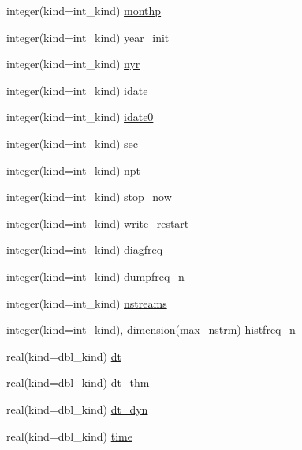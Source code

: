 \begin{DoxyCompactItemize}
\item 
integer(kind=int\_\-kind) \hyperlink{namespaceice__calendar_a2e88fbbaa94dea7baf4d46c950c5be7a}{monthp}
\item 
integer(kind=int\_\-kind) \hyperlink{namespaceice__calendar_afc3c91ad4e19b987b1e28293ec6ec2b7}{year\_\-init}
\item 
integer(kind=int\_\-kind) \hyperlink{namespaceice__calendar_ab1bfcde8457aafd600e9ff69b7ec6a3f}{nyr}
\item 
integer(kind=int\_\-kind) \hyperlink{namespaceice__calendar_aefc3f061e0c4d064b85e0fa84f0c92af}{idate}
\item 
integer(kind=int\_\-kind) \hyperlink{namespaceice__calendar_a60baa4e8bed2d175eaf6170ab792aa03}{idate0}
\item 
integer(kind=int\_\-kind) \hyperlink{namespaceice__calendar_a80ddbc12ee9fd336c3148dd0e31f420c}{sec}
\item 
integer(kind=int\_\-kind) \hyperlink{namespaceice__calendar_aac483d802138fd2e80f1945fb3385f35}{npt}
\item 
integer(kind=int\_\-kind) \hyperlink{namespaceice__calendar_a7d6b1e515218c3fa92e328b9cf745b59}{stop\_\-now}
\item 
integer(kind=int\_\-kind) \hyperlink{namespaceice__calendar_ab014cadf8e461a9743825f528cbd9e7a}{write\_\-restart}
\item 
integer(kind=int\_\-kind) \hyperlink{namespaceice__calendar_aec83d850502df509fde73dbd084c2dc5}{diagfreq}
\item 
integer(kind=int\_\-kind) \hyperlink{namespaceice__calendar_a0762fc870e55d2cfdfa80031188f4851}{dumpfreq\_\-n}
\item 
integer(kind=int\_\-kind) \hyperlink{namespaceice__calendar_ae00ad28547110901c77d6d4f2d87a7ea}{nstreams}
\item 
integer(kind=int\_\-kind), dimension(max\_\-nstrm) \hyperlink{namespaceice__calendar_ab7cea996ca05518dbde0dc027ee81c13}{histfreq\_\-n}
\item 
real(kind=dbl\_\-kind) \hyperlink{namespaceice__calendar_a8b89d489532c51cefe59876296c1f568}{dt}
\item 
real(kind=dbl\_\-kind) \hyperlink{namespaceice__calendar_a7c18b75ed60a7c1d0cbee86f4bca61de}{dt\_\-thm}
\item 
real(kind=dbl\_\-kind) \hyperlink{namespaceice__calendar_a3bb2bcfc8ce6074351961d80011c706a}{dt\_\-dyn}
\item 
real(kind=dbl\_\-kind) \hyperlink{namespaceice__calendar_a41fbc8dd30edf8e90070b7f5569fdd9b}{time}
\item 

\end{DoxyCompactItemize}
